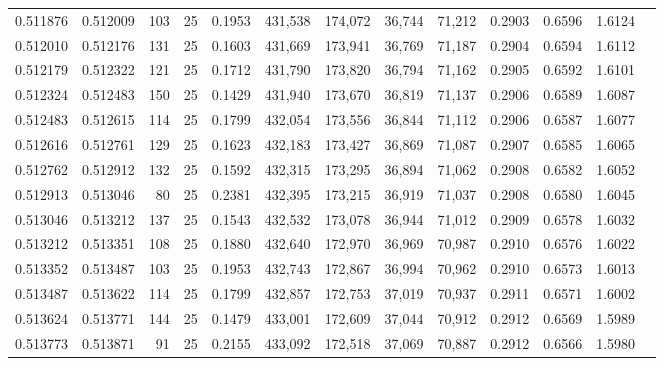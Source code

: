 \begin{tabular}{rrrrrrrrrrrrr}
0.511876 & 0.512009 &   103 &  25 &                                     0.1953 & 431,538 & 174,072 &  36,744 &  71,212 & 0.2903 & 0.6596 & 1.6124 \\
0.512010 & 0.512176 &   131 &  25 &                                     0.1603 & 431,669 & 173,941 &  36,769 &  71,187 & 0.2904 & 0.6594 & 1.6112 \\
0.512179 & 0.512322 &   121 &  25 &                                     0.1712 & 431,790 & 173,820 &  36,794 &  71,162 & 0.2905 & 0.6592 & 1.6101 \\
0.512324 & 0.512483 &   150 &  25 &                                     0.1429 & 431,940 & 173,670 &  36,819 &  71,137 & 0.2906 & 0.6589 & 1.6087 \\
0.512483 & 0.512615 &   114 &  25 &                                     0.1799 & 432,054 & 173,556 &  36,844 &  71,112 & 0.2906 & 0.6587 & 1.6077 \\
0.512616 & 0.512761 &   129 &  25 &                                     0.1623 & 432,183 & 173,427 &  36,869 &  71,087 & 0.2907 & 0.6585 & 1.6065 \\
0.512762 & 0.512912 &   132 &  25 &                                     0.1592 & 432,315 & 173,295 &  36,894 &  71,062 & 0.2908 & 0.6582 & 1.6052 \\
0.512913 & 0.513046 &    80 &  25 &                                     0.2381 & 432,395 & 173,215 &  36,919 &  71,037 & 0.2908 & 0.6580 & 1.6045 \\
0.513046 & 0.513212 &   137 &  25 &                                     0.1543 & 432,532 & 173,078 &  36,944 &  71,012 & 0.2909 & 0.6578 & 1.6032 \\
0.513212 & 0.513351 &   108 &  25 &                                     0.1880 & 432,640 & 172,970 &  36,969 &  70,987 & 0.2910 & 0.6576 & 1.6022 \\
0.513352 & 0.513487 &   103 &  25 &                                     0.1953 & 432,743 & 172,867 &  36,994 &  70,962 & 0.2910 & 0.6573 & 1.6013 \\
0.513487 & 0.513622 &   114 &  25 &                                     0.1799 & 432,857 & 172,753 &  37,019 &  70,937 & 0.2911 & 0.6571 & 1.6002 \\
0.513624 & 0.513771 &   144 &  25 &                                     0.1479 & 433,001 & 172,609 &  37,044 &  70,912 & 0.2912 & 0.6569 & 1.5989 \\
0.513773 & 0.513871 &    91 &  25 &                                     0.2155 & 433,092 & 172,518 &  37,069 &  70,887 & 0.2912 & 0.6566 & 1.5980 \\

\end{tabular}
